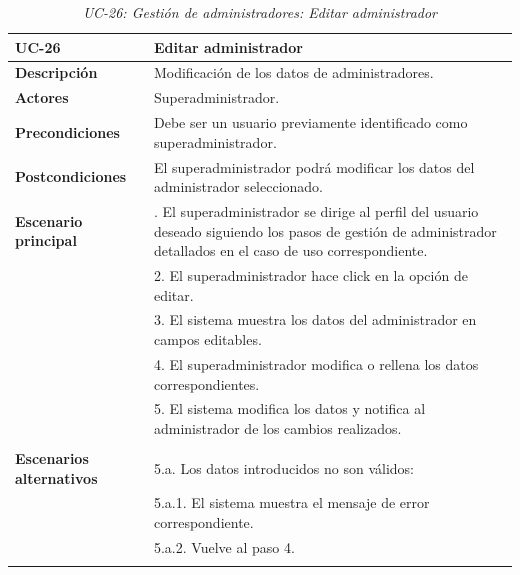 \begin{table}[H]
  \begin{center}
    \begin{tabularx}{16.4cm}{|l|X|}
      \hline
      \textbf{UC-26} & \textbf{Editar administrador}\\
      \hline
      \textbf{Descripción} & Modificación de los datos de administradores.\\
      \hline
      \textbf{Actores} & Superadministrador.\\
      \hline
      \textbf{Precondiciones} & Debe ser un usuario previamente identificado como superadministrador.\\
      \hline
      \textbf{Postcondiciones} & El superadministrador podrá modificar los datos del administrador seleccionado.\\
      \hline
      \textbf{Escenario principal} & \smallskip 1. El superadministrador se dirige al perfil del usuario deseado siguiendo los pasos de gestión de administrador detallados en el caso de uso correspondiente.\\
      & 2. El superadministrador hace click en la opción de editar. \\
      & 3. El sistema muestra los datos del administrador en campos editables.\\
      & 4. El superadministrador modifica o rellena los datos correspondientes.\\
      & 5. El sistema modifica los datos y notifica al administrador de los cambios realizados.\\ 
      & \\
      \hline
      \textbf{Escenarios alternativos} & \smallskip 5.a. Los datos introducidos no son válidos:\\
      & \hspace{0.3cm} 5.a.1. El sistema muestra el mensaje de error correspondiente.\\
      & \hspace{0.3cm} 5.a.2. Vuelve al paso 4.\\
      & \\
      \hline
    \end{tabularx}
    \caption{\textit{UC-26: Gestión de administradores: Editar administrador}}
    \label{tab:CU-editar-admin}
  \end{center}
\end{table}


